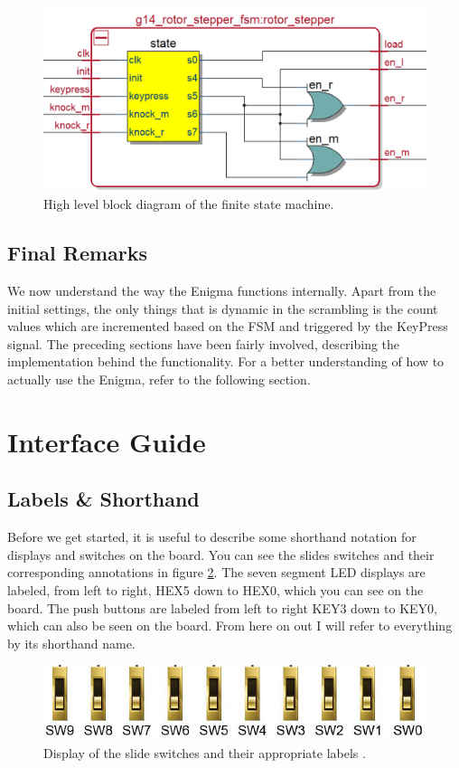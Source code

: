 \documentclass{article}
\begin{document}
\begin{figure}
    \centering
    \includegraphics[scale=0.3]{fsm_block_diag.PNG}
    \caption{High level block diagram of the finite state machine.}
    \label{fig:fsm_block_diag}
\end{figure}

\subsection{Final Remarks}
We now understand the way the Enigma functions internally. Apart from the initial settings, the only things that is dynamic in the scrambling is the count values which are incremented based on the FSM and triggered by the KeyPress signal. The preceding sections have been fairly involved, describing the implementation behind the functionality. For a better understanding of how to actually use the Enigma, refer to the following section.


\section{Interface Guide} \label{guide}

\subsection{Labels \& Shorthand}
Before we get started, it is useful to describe some shorthand notation for displays and switches on the board. You can see the slides switches and their corresponding annotations in figure \ref{fig:slide_switch_shorthand}. The seven segment LED displays are labeled, from left to right, HEX5 down to HEX0, which you can see on the board. The push buttons are labeled from left to right KEY3 down to KEY0, which can also be seen on the board. From here on out I will refer to everything by its shorthand name. 

\begin{figure}[ht!]
    \centering
    \includegraphics{slide_switch_shorthand.PNG}
    \caption{Display of the slide switches and their appropriate labels \cite{soc_manual}.}
    \label{fig:slide_switch_shorthand}
\end{figure}
\end{document}
